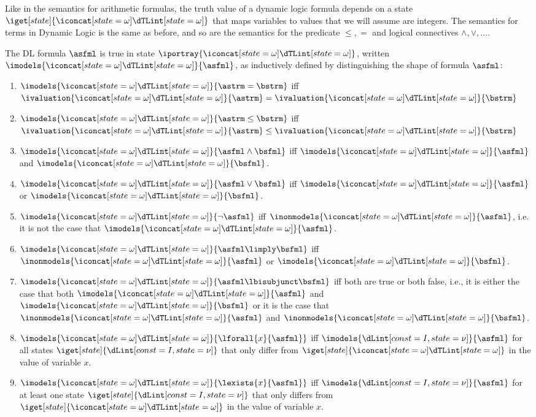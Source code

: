\documentclass[11pt,twoside]{scrartcl}
\begin{document}
Like in the semantics for arithmetic formulas, the truth value of a dynamic logic formula depends on a state $\iget[state]{\I}$ that maps variables to values that we will assume are integers. The semantics for terms in Dynamic Logic is the same as before, and so are the semantics for the predicate $\le,=$ and logical connectives $\land,\lor,\ldots$.

\begin{definition} \label{def:DL-semantics}
The DL formula $\asfml$ is true in state $\iportray{\I}$, written \(\imodels{\I}{\asfml}\), as inductively defined by distinguishing the shape of formula $\asfml$:
\begin{enumerate}
\item \(\imodels{\I}{\astrm=\bstrm}\) iff \(\ivaluation{\I}{\astrm}=\ivaluation{\I}{\bstrm}\)

\item \(\imodels{\I}{\astrm\leq\bstrm}\) iff \(\ivaluation{\I}{\astrm}\leq\ivaluation{\I}{\bstrm}\)

\item \(\imodels{\I}{\asfml\land\bsfml}\) iff \(\imodels{\I}{\asfml}\) and \(\imodels{\I}{\bsfml}\).

\item \(\imodels{\I}{\asfml\lor\bsfml}\) iff \(\imodels{\I}{\asfml}\) or \(\imodels{\I}{\bsfml}\).

\item \(\imodels{\I}{\lnot\asfml}\) iff \(\inonmodels{\I}{\asfml}\), i.e. it is not the case that \(\imodels{\I}{\asfml}\).

\item \(\imodels{\I}{\asfml\limply\bsfml}\) iff \(\inonmodels{\I}{\asfml}\) or \(\imodels{\I}{\bsfml}\).

\item \(\imodels{\I}{\asfml\lbisubjunct\bsfml}\) iff both are true or both false, i.e., it is either the case that both \(\imodels{\I}{\asfml}\) and \(\imodels{\I}{\bsfml}\) or it is the case that \(\inonmodels{\I}{\asfml}\) and \(\inonmodels{\I}{\bsfml}\).

\item \(\imodels{\I}{\lforall{x}{\asfml}}\) iff \(\imodels{\It}{\asfml}\) for all states $\iget[state]{\It}$ that only differ from $\iget[state]{\I}$ in the value of variable $x$.

\item \(\imodels{\I}{\lexists{x}{\asfml}}\) iff \(\imodels{\It}{\asfml}\) for at least one state $\iget[state]{\It}$ that only differs from $\iget[state]{\I}$ in the value of variable $x$.


\end{enumerate}
\end{definition}
\end{document}
